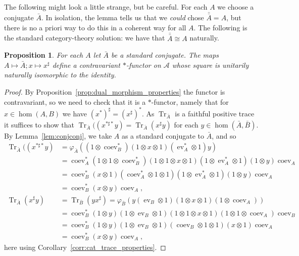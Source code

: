 \documentclass[a4paper,11pt]{article}
\theoremstyle{plain}
\newtheorem{proposition}{Proposition}[section]
\theoremstyle{remark}
\newcommand{\mc}[1]{\mathcal{#1}}
\newcommand{\ev}{\operatorname{ev}}
\newcommand{\coev}{\operatorname{coev}}
\newcommand{\conj}[1]{\bar{#1}}
\newcommand{\tr}{\operatorname{Tr}}
\begin{document}
The following might look a little strange, but be careful.  For each $A$ we choose a conjugate $\conj A$.  In isolation, the lemma tells us that we \emph{could} chose $\conj{\conj A} = A$, but there is no a priori way to do this in a coherent way for all $A$.  The following is the standard category-theory solution: we have that $\conj{\conj A} \cong A$ naturally.

\begin{proposition}
For each $A$ let $\conj A$ be a standard conjugate.  The maps $A\mapsto\conj A; x\mapsto x^\sharp$ define a contravariant $*$-functor on $\mc A$ whose square is unitarily naturally isomorphic to the identity.
\end{proposition}
\begin{proof}
By Proposition~\ref{prop:dual_morphism_properties} the functor is contravariant, so we need to check that it is a $*$-functor, namely that for $x\in\hom(A,B)$ we have $(x^*)^\sharp = (x^\sharp)^*$.  As $\tr_{\conj A}$ is a faithful positive trace it suffices to show that $\tr_{\conj A}((x^{*\sharp*}y) = \tr_{\conj A}(x^\sharp y)$ for each $y\in\hom(\conj A,\conj B)$.  By Lemma~\ref{lem:conjconj}, we take $A$ as a standard conjugate to $\conj A$, and so
\begin{align*}
\tr_{\conj A}((x^{*\sharp*}y)
&= \varphi_{\conj A}( (1\otimes\coev_B^*)(1\otimes x\otimes 1)(\ev_A^*\otimes 1) y ) \\
&= \coev_A^* (1\otimes1\otimes\coev_B^*) (1\otimes1\otimes x\otimes 1) (1\otimes\ev_A^*\otimes 1) (1\otimes y) \coev_A \\
&= \coev_B^*(x\otimes 1) (\coev_A^*\otimes 1\otimes 1)(1\otimes\ev_A^*\otimes 1) (1\otimes y) \coev_A \\
&= \coev_B^*(x\otimes y) \coev_A, \\
\tr_{\conj A}(x^\sharp y)
&= \tr_{\conj B}(y x^\sharp)
= \varphi_{\conj B}( y (\ev_B\otimes 1)(1\otimes x\otimes 1)(1\otimes\coev_A) ) \\
&= \coev_B^* (1\otimes y) (1\otimes\ev_B\otimes 1) (1\otimes1\otimes x\otimes 1)(1\otimes 1\otimes\coev_A) \coev_B \\
&= \coev_B^* (1\otimes y) (1\otimes\ev_B\otimes 1) (\coev_B\otimes 1\otimes 1) (x\otimes 1)\coev_A \\
&= \coev_B^* (x\otimes y) \coev_A,
\end{align*}
here using Corollary~\ref{corr:cat_trace_properties}.


\end{proof}
\end{document}
